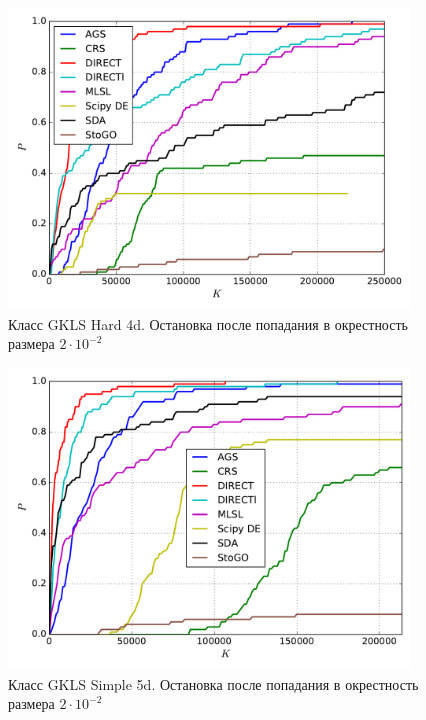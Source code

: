\documentclass[a4paper]{article}
\begin{document}
\begin{figure}[H]
  \center
  \includegraphics[width=0.95\textwidth]{../experiments/gklsh4d/cmc.pdf}
  \caption{Класс GKLS Hard 4d. Остановка после попадания в окрестность размера $2\cdot10^{-2}$}
  \label{fig:}
\end{figure}


\begin{figure}[H]
  \center
  \includegraphics[width=0.95\textwidth]{../experiments/gklss5d/cmc.pdf}
  \caption{Класс GKLS Simple 5d. Остановка после попадания в окрестность размера $2\cdot10^{-2}$}
  \label{fig:}
\end{figure}

\end{document}
